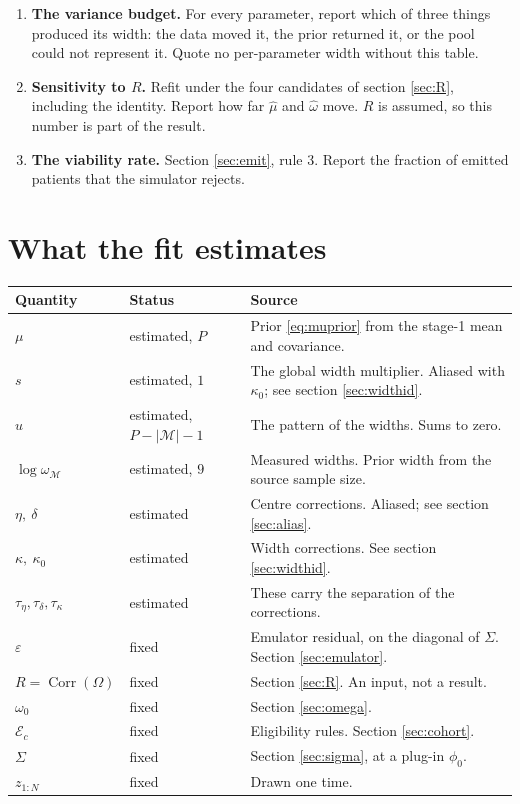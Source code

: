 \documentclass[11pt]{article}
\newcommand{\Mset}{\mathcal{M}}
\DeclareMathOperator{\Corr}{Corr}
\begin{document}
\begin{enumerate}
      against the emulator. Report the result beside the design residual.
\item \textbf{The variance budget.} For every parameter, report which of three
      things produced its width: the data moved it, the prior returned it, or the
      pool could not represent it. Quote no per-parameter width without this
      table.
\item \textbf{Sensitivity to $R$.} Refit under the four candidates of section
      \ref{sec:R}, including the identity. Report how far $\hat\mu$ and
      $\hat\omega$ move. $R$ is assumed, so this number is part of the result.
\item \textbf{The viability rate.} Section \ref{sec:emit}, rule 3. Report the
      fraction of emitted patients that the simulator rejects.
\end{enumerate}

\section{What the fit estimates}

\begin{center}\small
\begin{tabularx}{\textwidth}{@{}llX@{}}
\toprule
Quantity & Status & Source \\
\midrule
$\mu$ & estimated, $P$ & Prior \eqref{eq:muprior} from the stage-1 mean and covariance. \\
$s$ & estimated, $1$ & The global width multiplier. Aliased with $\kappa_0$; see section \ref{sec:widthid}. \\
$u$ & estimated, $P{-}|\Mset|{-}1$ & The pattern of the widths. Sums to zero. \\
$\log\omega_\Mset$ & estimated, $9$ & Measured widths. Prior width from the source sample size. \\
$\eta,\ \delta$ & estimated & Centre corrections. Aliased; see section \ref{sec:alias}. \\
$\kappa,\ \kappa_0$ & estimated & Width corrections. See section \ref{sec:widthid}. \\
$\tau_\eta,\tau_\delta,\tau_\kappa$ & estimated & These carry the separation of the corrections. \\
$\varepsilon$ & fixed & Emulator residual, on the diagonal of $\Sigma$. Section \ref{sec:emulator}. \\
$R=\Corr(\Omega)$ & fixed & Section \ref{sec:R}. An input, not a result. \\
$\omega_0$ & fixed & Section \ref{sec:omega}. \\
$\mathcal{E}_c$ & fixed & Eligibility rules. Section \ref{sec:cohort}. \\
$\Sigma$ & fixed & Section \ref{sec:sigma}, at a plug-in $\phi_0$. \\
$z_{1:N}$ & fixed & Drawn one time. \\
\bottomrule
\end{tabularx}
\end{center}
\end{document}
